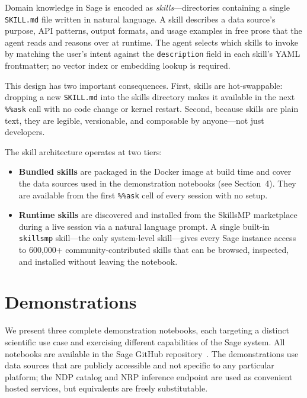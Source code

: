 \documentclass[10pt,twocolumn]{article}
\begin{document}
Domain knowledge in Sage is encoded as \emph{skills}---directories containing a single \texttt{SKILL.md} file written in natural language. A skill describes a data source's purpose, API patterns, output formats, and usage examples in free prose that the agent reads and reasons over at runtime. The agent selects which skills to invoke by matching the user's intent against the \texttt{description} field in each skill's YAML frontmatter; no vector index or embedding lookup is required.

This design has two important consequences. First, skills are hot-swappable: dropping a new \texttt{SKILL.md} into the skills directory makes it available in the next \texttt{\%\%ask} call with no code change or kernel restart. Second, because skills are plain text, they are legible, versionable, and composable by anyone---not just developers.

The skill architecture operates at two tiers:

\begin{itemize}
  \item \textbf{Bundled skills} are packaged in the Docker image at build time and cover the data sources used in the demonstration notebooks (see Section~4). They are available from the first \texttt{\%\%ask} cell of every session with no setup.
  \item \textbf{Runtime skills} are discovered and installed from the SkillsMP marketplace~\cite{skillsmp} during a live session via a natural language prompt. A single built-in \texttt{skillsmp} skill---the only system-level skill---gives every Sage instance access to 600,000+ community-contributed skills that can be browsed, inspected, and installed without leaving the notebook.
\end{itemize}

\section{Demonstrations}

We present three complete demonstration notebooks, each targeting a distinct scientific use case and exercising different capabilities of the Sage system. All notebooks are available in the Sage GitHub repository~\cite{sage_github}. The demonstrations use data sources that are publicly accessible and not specific to any particular platform; the NDP catalog and NRP inference endpoint are used as convenient hosted services, but equivalents are freely substitutable.
\end{document}
